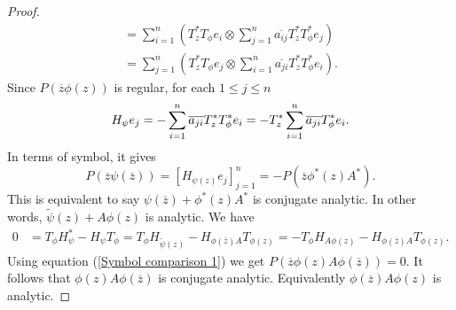 \documentclass[12pt, reqno]{amsart}
\theoremstyle{definition}
\theoremstyle{remark}
\numberwithin{equation}{section}
\begin{document}
\begin{proof}
\begin{align*}
            = \sum_{i=1}^{n}(T_z^*T_\phi e_i \otimes \sum_{j=1}^{n}\overline{a_{ij}}T^*_zT^*_\phi e_j)\\
             = \sum_{j=1}^{n}(T_z^*T_\phi e_j \otimes \sum_{i=1}^{n}\overline{a_{ji}}T^*_zT^*_\phi e_i).
            \end{align*}
            Since $P(\overline z \phi(z))$ is regular, for each $1 \leq j \leq n$
            \begin{equation*}
                 H_\psi e_j=-\sum_{i=1}^{n}\overline{a_{ji}}T^*_zT^*_\phi e_i\\
                 =-T^*_z\sum_{i=1}^{n}\overline{a_{ji}}T^*_\phi e_i.\\
            \end{equation*}
            In terms of symbol, it gives
            \begin{equation*}
                 P(\overline z\psi(\overline z))=[H_{\psi(z)}e_j]_{j=1}^{n}= -P(\overline z \phi^*(z)A^*).
            \end{equation*}
            This is equivalent to say $\psi(\overline z)+\phi^*(z)A^*$ is conjugate analytic. In other words, $ \tilde \psi (z)+A\phi(z)$ is analytic. We have
            \begin{align*}
                0&=T_\phi H_\psi^*-H_\psi T_\phi =T_\phi H_{\tilde{\psi}(z)}-H_{\phi(\overline z)A}T_{\phi(z)}=-T_\phi H_{A\phi(z)}-H_{\phi(\overline z)A}T_{\phi(z)}.
            \end{align*}
            Using equation (\ref{Symbol comparison 1}) we get $P(\overline z\phi(z)A\phi(\overline{z}))=0$. It follows that  $\phi(z)A\phi(\overline{z})$ is conjugate analytic. Equivalently $\phi(\overline{z})A\phi(z)$ is analytic.
    \end{proof} 
\end{document}
